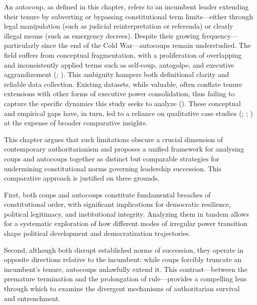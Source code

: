 \documentclass[
  12pt,
]{report}
\begin{document}
An autocoup, as defined in this chapter, refers to an incumbent leader
extending their tenure by subverting or bypassing constitutional term
limits---either through legal manipulation (such as judicial
reinterpretation or referenda) or clearly illegal means (such as
emergency decrees). Despite their growing frequency---particularly since
the end of the Cold War---autocoups remain understudied. The field
suffers from conceptual fragmentation, with a proliferation of
overlapping and inconsistently applied terms such as self-coup,
autogolpe, and executive aggrandizement
(;
). This ambiguity
hampers both definitional clarity and reliable data collection. Existing
datasets, while valuable, often conflate tenure extensions with other
forms of executive power consolidation, thus failing to capture the
specific dynamics this study seeks to analyze
(). These conceptual
and empirical gaps have, in turn, led to a reliance on qualitative case
studies (;
;
)
at the expense of broader comparative insights.

This chapter argues that such limitations obscure a crucial dimension of
contemporary authoritarianism and proposes a unified framework for
analysing coups and autocoups together as distinct but comparable
strategies for undermining constitutional norms governing leadership
succession. This comparative approach is justified on three grounds.

First, both coups and autocoups constitute fundamental breaches of
constitutional order, with significant implications for democratic
resilience, political legitimacy, and institutional integrity. Analyzing
them in tandem allows for a systematic exploration of how different
modes of irregular power transition shape political development and
democratization trajectories.

Second, although both disrupt established norms of succession, they
operate in opposite directions relative to the incumbent: while coups
forcibly truncate an incumbent's tenure, autocoups unlawfully extend it.
This contrast---between the premature termination and the prolongation
of rule---provides a compelling lens through which to examine the
divergent mechanisms of authoritarian survival and entrenchment.
\end{document}

